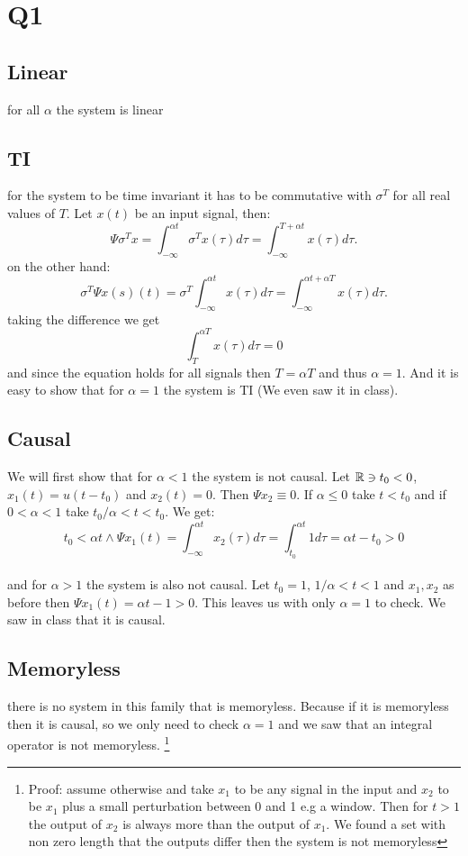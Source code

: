 \section{Q1}
\subsection{Linear}
for all $\alpha$ the system is linear
\subsection{TI}
for the system to be time invariant it has to be commutative with $\sigma^T$ for all real values of $T$. Let $x(t)$ be an input signal, then:
\begin{equation}
    \Psi{\sigma^T{x}}=\int_{-\infty}^{\alpha t}
        \sigma^T{x}(\tau)d\tau
        =\int_{-\infty}^{T+\alpha t}x(\tau)d\tau.
\end{equation}
on the other hand:
\begin{equation}
    \sigma^T{\Psi{x}(s)}(t)=\sigma^T{\int_{-\infty}^{\alpha t}x(\tau)d\tau}=\int_{-\infty}^{\alpha t + \alpha T}x(\tau)d\tau.
\end{equation}
taking the difference we get 
$$\int_{T}^{\alpha T}x(\tau)d\tau = 0$$
and since the equation holds for all signals then $T=\alpha T$ and thus $\alpha=1$. And it is easy to show that for $\alpha=1$ the system is TI (We even saw it in class).
\subsection{Causal}
We will first show that for $\alpha< 1$ the system is not causal. Let $\mathbb{R}\ni t_0<0$, $x_1(t)=u(t-t_0)$ and $x_2(t)=0$. Then $\Psi{x_2}\equiv 0$. If $\alpha\leq 0$ take $t<t_0$ and if $0<\alpha<1$ take $t_0/\alpha<t<t_0$. We get:
\[
    t_0 < \alpha t \wedge
    \Psi{x_1}(t)=\int_{-\infty}^{\alpha t} x_2(\tau)d\tau = \int_{t_0}^{\alpha t} 1 d\tau = \alpha t-t_0 > 0
\]
\\
and for $\alpha>1$ the system is also not causal. Let $t_0=1$, $1/\alpha<t<1$ and $x_1,x_2$ as before then $\Psi{x_1}(t)=\alpha t -1>0$.
This leaves us with only $\alpha=1$ to check. We saw in class that it is causal.
\subsection{Memoryless}
there is no system in this family that is memoryless. Because if it is memoryless then it is causal, so we only need to check $\alpha=1$ and we saw that an integral operator is not memoryless. 
\footnote{
Proof: assume otherwise and take $x_1$ to be any signal in the input and $x_2$ to be $x_1$ plus a small perturbation between 0 and 1 e.g a window. Then for $t>1$ the output of $x_2$ is always more than the output of $x_1$. We found a set with non zero length that the outputs differ then the system is not memoryless
}
